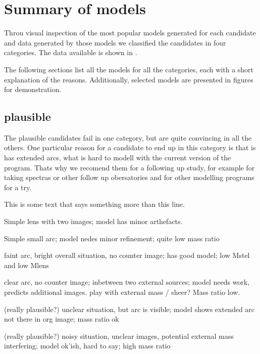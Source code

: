 \section{Summary of models}

Throu visual inspection of the most popular models generated for each candidate and data generated by those models we classified the candidates in four categories.
The data available is shown in .

The following sections list all the models for all the categories, each with a short explanation of the reasons.
Additionally, selected models are presented in figures for demonstration.

\subsection{plausible}

The plausible candidates fail in one category, but are quite convincing in all the others.
One particular reason for a candidate to end up in this category is that is has extended arcs, what is hard to modell with the current version of the program.
Thats why we recomend them for a following up study, for example for taking spectras or other follow up obersatories and for other modelling programs for a try.


  This is some text that says something more than this line.

  Simple lens with two images;
  model has minor arthefacts.

  Simple small arc;
  model nedes minor refinement;
  quite low mass ratio
  
  faint arc, bright overall situation, no counter image;
  has good model;
  low Mstel and low Mlens
  
  clear arc, no counter image; inbetween two external sources;
  model needs work, predicts additional images. play with external mass / sheer?
  Mass ratio low.
  
  (really plausible?)
  unclear situation, but arc is visible;
  model shows extended arc not there in org image;
  mass ratio ok
  
  (really plausible?)
  noisy situation, unclear images, potential external mass interfering;
  model ok'ish, hard to say;
  high mass ratio
  
